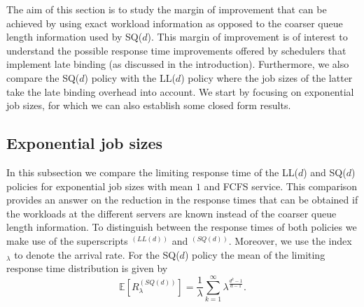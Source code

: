 \documentclass[12pt]{report}
\newcommand{\E}{\mathbb{E}}
\begin{document}
The aim of this section is to study the margin of improvement that can be achieved by using 
exact workload information as opposed to the coarser queue length information used
by SQ($d$). This margin of improvement is of interest to understand the possible 
response time improvements offered by schedulers that implement late binding
(as discussed in the introduction). Furthermore, we also compare the SQ($d$) policy with
the LL($d$) policy where the job sizes of the latter take the late binding
overhead into account. We start by focusing on exponential job sizes, for which
we can also establish some closed form results.

\subsection{Exponential job sizes}
In this subsection we compare the limiting response time of the LL($d$) and SQ($d$) policies for exponential job sizes
with mean $1$ and FCFS service. This comparison provides an answer on the reduction in the response times that can be obtained
if the workloads at the different servers are known instead of the coarser queue length information.
To distinguish between the response times of both policies we make use of the superscripts $^{(LL(d))}$ and $^{(SQ(d))}$. Moreover, we use the index $_\lambda$ to denote the arrival rate.
For the SQ($d$) policy the mean of the limiting response time distribution is given by \cite{mitzenmacher2}  
\[ \E\left[R^{(SQ(d))}_\lambda\right] = \frac{1}{\lambda} \sum_{k=1}^\infty \lambda^{\frac{d^k-1}{d-1}}.\]
\end{document}
